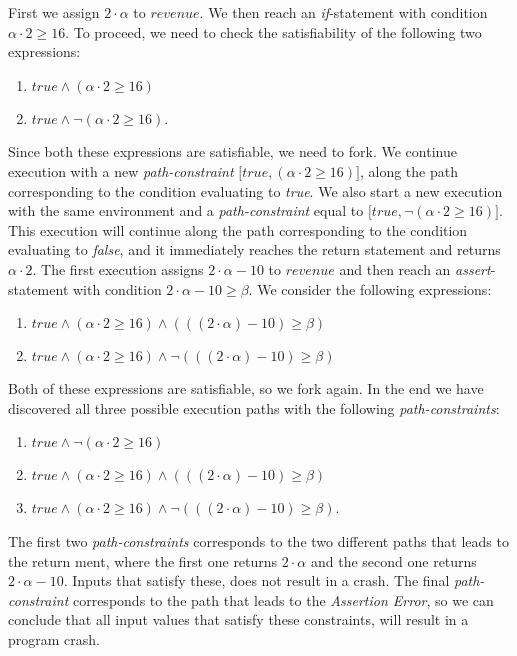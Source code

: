 		First we assign $2\cdot \alpha$ to $revenue$. We then reach an \textsl{if}-statement with condition $\alpha \cdot 2 \geq 16$. To proceed, we need to check the satisfiability of the following two expressions:
		\begin{enumerate}
			\item $true \land (\alpha \cdot 2 \geq 16)$
			\item $true \land \neg (\alpha \cdot 2 \geq 16)$.
		\end{enumerate}
		Since both these expressions are satisfiable, we need to fork. We continue execution with a new  \emph{path-constraint} $\lbrack true, (\alpha \cdot 2 \geq 16) \rbrack$, along the path corresponding to the condition evaluating to \emph{true}. We also start a new execution with the same environment and a \emph{path-constraint} equal to $\lbrack true, \neg (\alpha \cdot 2 \geq 16) \rbrack$. This execution will continue along the path corresponding to the condition evaluating to \emph{false}, and it immediately reaches the return statement and returns $\alpha \cdot 2$.
		The first execution assigns $2\cdot \alpha - 10$ to $revenue$ and then reach an \textsl{assert}-statement with condition $2\cdot \alpha - 10 \geq \beta$. We consider the following expressions:
		\begin{enumerate}
			\item $true \land (\alpha \cdot 2 \geq 16) \land (((2\cdot \alpha) - 10) \geq \beta)$
			\item $true \land (\alpha \cdot 2 \geq 16) \land \neg (((2\cdot \alpha) - 10) \geq \beta)$
		\end{enumerate}
		Both of these expressions are satisfiable, so we fork again. In the end we have discovered all three possible execution paths with the following \emph{path-constraints}:
		\begin{enumerate}
			\item $true \land \neg (\alpha \cdot 2 \geq 16)$
			\item $true \land (\alpha \cdot 2 \geq 16) \land (((2\cdot \alpha) - 10) \geq \beta)$
			\item $true \land (\alpha \cdot 2 \geq 16) 
			\land \neg (((2\cdot \alpha) - 10) \geq \beta)$.
		\end{enumerate}
		
		The first two \emph{path-constraints} corresponds to the two different paths that leads to the return  ment, where the first one returns $2\cdot \alpha$ and the second one returns $2\cdot \alpha - 10$. Inputs that satisfy these, does not result in a crash.
		The final \emph{path-constraint} corresponds to the path that leads to the \textsl{Assertion Error}, so we can conclude that all input values that satisfy these constraints, will result in a program crash.
	

